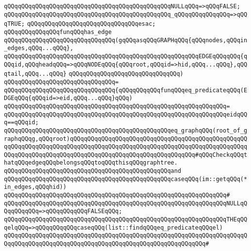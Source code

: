 \verb|qQQqqQQqqQQqqQQqqQQqqQQqqQQqqQQqqQQqqQQqqQQqqQQqNULLqQQq=>qQQqFALSE;|\newline
\verb|qQQqqQQqqQQqqQQqqQQqqQQqqQQqqQQqqQQqqQQqqQQqqQQq_qQQqqQQqqQQqqQQq=>qQQqTRUE;|\newline
\verb|qQQqqQQqqQQqqQQqqQQqqQQqqQQqqQQqesac;|\newline
\newline
\verb|qQQqqQQqqQQqqQQqfunqQQqhas_edge|\newline
\verb|qQQqqQQqqQQqqQQqqQQqqQQqqQQqqQQq(gqQQqasqQQqGRAPHqQQq{qQQqnodes,qQQqin_edges,qQQq...qQQq},|\newline
\verb|qQQqqQQqqQQqqQQqqQQqqQQqqQQqqQQqqQQqqQQqqQQqqQQqqQQqqQQqEDGEqQQqqQQq{qQQqid,qQQqheadqQQq=>qQQqNODEqQQq{qQQqroot,qQQqid=>hid,qQQq...qQQq},qQQqtail,qQQq...qQQq}|\newline
\verb|qQQqqQQqqQQqqQQqqQQqqQQqqQQqqQQq)|\newline
\verb|qQQqqQQqqQQqqQQqqQQqqQQqqQQqqQQq=|\newline
\verb|qQQqqQQqqQQqqQQqqQQqqQQqqQQqqQQq{qQQqqQQqqQQqfunqQQqeq_predicateqQQq(EDGEqQQq{qQQqid=>eid,qQQq...qQQq}qQQq)|\newline
\verb|qQQqqQQqqQQqqQQqqQQqqQQqqQQqqQQqqQQqqQQqqQQqqQQqqQQqqQQqqQQqqQQq=|\newline
\verb|qQQqqQQqqQQqqQQqqQQqqQQqqQQqqQQqqQQqqQQqqQQqqQQqqQQqqQQqqQQqqQQqeidqQQq==qQQqid;|\newline
\newline
\verb|qQQqqQQqqQQqqQQqqQQqqQQqqQQqqQQqqQQqqQQqqQQqqQQqeq_graphqQQq(root_of_graphqQQqg,qQQqroot)qQQqqQQqqQQqqQQqqQQqqQQqqQQqqQQqqQQqqQQqqQQqqQQqqQQqqQQqqQQqqQQqqQQqqQQqqQQqqQQqqQQqqQQqqQQqqQQqqQQqqQQqqQQqqQQqqQQqqQQqqQQqqQQqqQQqqQQqqQQqqQQqqQQqqQQqqQQqqQQqqQQqqQQqqQQqqQQq#qQQqCheckqQQqthatqQQqedgeqQQqbelongsqQQqtoqQQqthisqQQqgraphtree.|\newline
\verb|qQQqqQQqqQQqqQQqqQQqqQQqqQQqqQQqqQQqqQQqqQQqqQQqand|\newline
\verb|qQQqqQQqqQQqqQQqqQQqqQQqqQQqqQQqqQQqqQQqqQQqqQQqcaseqQQq(im::getqQQq(*in_edges,qQQqhid))|\newline
\verb|qQQqqQQqqQQqqQQqqQQqqQQqqQQqqQQqqQQqqQQqqQQqqQQqqQQqqQQqqQQqqQQq#|\newline
\verb|qQQqqQQqqQQqqQQqqQQqqQQqqQQqqQQqqQQqqQQqqQQqqQQqqQQqqQQqqQQqqQQqNULLqQQqqQQqqQQq=>qQQqqQQqqQQqFALSEqQQq;|\newline
\verb|qQQqqQQqqQQqqQQqqQQqqQQqqQQqqQQqqQQqqQQqqQQqqQQqqQQqqQQqqQQqqQQqTHEqQQqelqQQq=>qQQqqQQqqQQqcaseqQQq(list::findqQQqeq_predicateqQQqel)|\newline
\verb|qQQqqQQqqQQqqQQqqQQqqQQqqQQqqQQqqQQqqQQqqQQqqQQqqQQqqQQqqQQqqQQqqQQqqQQqqQQqqQQqqQQqqQQqqQQqqQQqqQQqqQQqqQQqqQQqqQQqqQQqqQQqqQQq#|\newline
